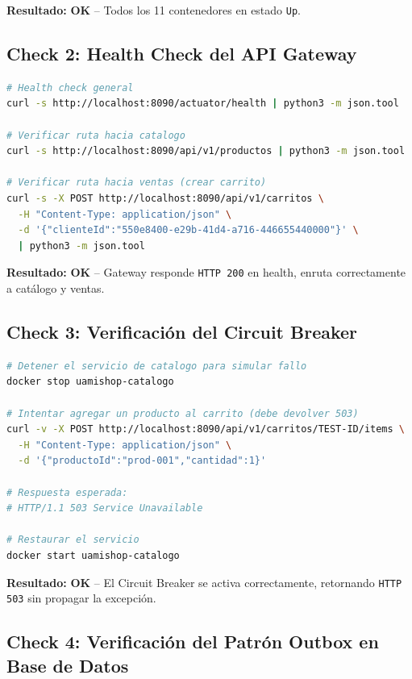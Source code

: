 \documentclass[12pt,a4paper]{article}
\newcommand{\ok}{\textcolor{passgreen}{\bfseries OK}}
\begin{document}
\textbf{Resultado:} \ok{} -- Todos los 11 contenedores en estado \texttt{Up}.

\subsection{Check 2: Health Check del API Gateway}

\begin{lstlisting}[language=bash, caption={Verificar health del Gateway y rutas principales}]
# Health check general
curl -s http://localhost:8090/actuator/health | python3 -m json.tool

# Verificar ruta hacia catalogo
curl -s http://localhost:8090/api/v1/productos | python3 -m json.tool

# Verificar ruta hacia ventas (crear carrito)
curl -s -X POST http://localhost:8090/api/v1/carritos \
  -H "Content-Type: application/json" \
  -d '{"clienteId":"550e8400-e29b-41d4-a716-446655440000"}' \
  | python3 -m json.tool
\end{lstlisting}

\textbf{Resultado:} \ok{} -- Gateway responde \texttt{HTTP 200} en health, enruta correctamente a cat\'alogo y ventas.

\subsection{Check 3: Verificaci\'on del Circuit Breaker}

\begin{lstlisting}[language=bash, caption={Verificar activaci\'on del Circuit Breaker}]
# Detener el servicio de catalogo para simular fallo
docker stop uamishop-catalogo

# Intentar agregar un producto al carrito (debe devolver 503)
curl -v -X POST http://localhost:8090/api/v1/carritos/TEST-ID/items \
  -H "Content-Type: application/json" \
  -d '{"productoId":"prod-001","cantidad":1}'

# Respuesta esperada:
# HTTP/1.1 503 Service Unavailable

# Restaurar el servicio
docker start uamishop-catalogo
\end{lstlisting}

\textbf{Resultado:} \ok{} -- El Circuit Breaker se activa correctamente, retornando \texttt{HTTP 503} sin propagar la excepci\'on.

\subsection{Check 4: Verificaci\'on del Patr\'on Outbox en Base de Datos}
\end{document}
